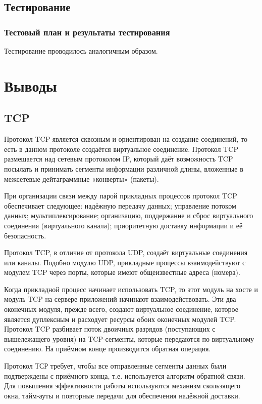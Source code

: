 \documentclass[12pt,a4paper]{report}
\begin{document}
\section{Тестирование}
\subsection{Тестовый план и результаты тестирования}
Тестирование проводилось аналогичным образом.

\chapter{Выводы}
\section{TCP}
  Протокол TCP является сквозным и ориентирован на создание соединений, то есть в данном протоколе создаётся виртуальное соединение. Протокол TCP размещается над сетевым протоколом IP, который даёт возможность TCP посылать и принимать сегменты информации различной длины, вложенные в межсетевые дейтаграммные «конверты» (пакеты).

      При организации связи между парой прикладных процессов протокол TCP обеспечивает следующее: надёжную передачу данных; управление потоком данных; мультиплексирование; организацию, поддержание и сброс виртуального соединения (виртуального канала); приоритетную доставку информации и её безопасность.

      Протокол TCP, в отличие от протокола UDP, создаёт виртуальные соединения или каналы. Подобно модулю UDP, прикладные процессы взаимодействуют с модулем TCP через порты, которые имеют общеизвестные адреса (номера).

Когда прикладной процесс начинает использовать TCP, то этот модуль на хосте и модуль TCP на сервере приложений начинают взаимодействовать. Эти два оконечных модуля, прежде всего, создают виртуальное соединение, которое является дуплексным и расходует ресурсы обоих оконечных модулей TCP. Протокол TCP разбивает поток двоичных разрядов (поступающих с вышележащего уровня) на TCP-сегменты, которые передаются по виртуальному соединению. На приёмном конце производится обратная операция.

      Протокол ТСР требует, чтобы все отправленные сегменты данных были подтверждены с приёмного конца, т.е. используется алгоритм обратной связи. Для повышения эффективности работы используются механизм скользящего окна, тайм-ауты и повторные передачи для обеспечения надёжной доставки. 
\end{document}
